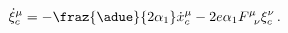 \begin{equation}
\dot{\xi}^\mu_c=-\fraz {\adue}
{2\alpha_1}\dot{x}^\mu_c-2e\alpha_1F^\mu_{\phantom{\mu}\nu}\xi^\nu_c\,.
\end{equation}

